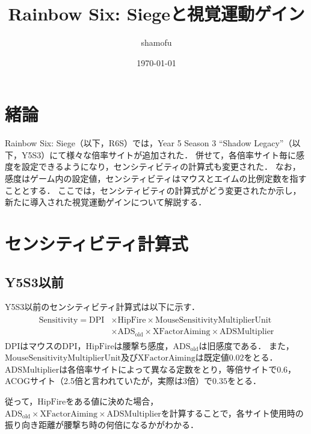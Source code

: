 \documentclass[uplatex, dvipdfmx, ja=standard, a4paper]{bxjsarticle}
\title{Rainbow Six: Siegeと視覚運動ゲイン}
\author{shamofu}
\date{\today}
\begin{document}
\maketitle

\section{緒論}
Rainbow Six: Siege（以下，R6S）では，Year 5 Season 3 ``Shadow Legacy''（以下，Y5S3）にて様々な倍率サイトが追加された．
併せて，各倍率サイト毎に感度を設定できるようになり，センシティビティの計算式も変更された．
なお，感度はゲーム内の設定値，センシティビティはマウスとエイムの比例定数を指すこととする．
ここでは，センシティビティの計算式がどう変更されたか示し，新たに導入された視覚運動ゲインについて解説する．

\section{センシティビティ計算式}
\subsection{Y5S3以前}
Y5S3以前のセンシティビティ計算式は以下に示す．
\begin{align}
  \begin{split}
    \mathrm{Sensitivity} = \mathrm{DPI} &\times \mathrm{HipFire} \times \mathrm{MouseSensitivityMultiplierUnit} \\
    &\times \mathrm{ADS}_{\mathrm{old}} \times \mathrm{XFactorAiming} \times \mathrm{ADSMultiplier}
  \end{split}
  \label{oldsensi}
\end{align}
\(\mathrm{DPI}\)はマウスのDPI，\(\mathrm{HipFire}\)は腰撃ち感度，\(\mathrm{ADS}_{\mathrm{old}}\)は旧感度である．
また，\(\mathrm{MouseSensitivityMultiplierUnit}\)及び\(\mathrm{XFactorAiming}\)は既定値\(0.02\)をとる．
\(\mathrm{ADSMultiplier}\)は各倍率サイトによって異なる定数をとり，等倍サイトで\(0.6\)，ACOGサイト（2.5倍と言われていたが，実際は3倍）で\(0.35\)をとる．

従って，\(\mathrm{HipFire}\)をある値に決めた場合，\(\mathrm{ADS}_{\mathrm{old}} \times \mathrm{XFactorAiming} \times \mathrm{ADSMultiplier}\)を計算することで，各サイト使用時の振り向き距離が腰撃ち時の何倍になるかがわかる．
\end{document}
